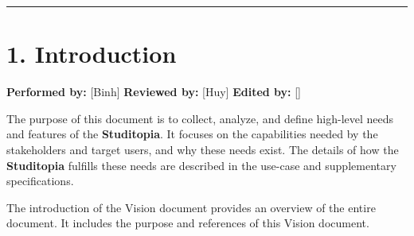 \documentclass[12pt]{article}
\begin{document}
\par\noindent\rule{\linewidth}{0.4pt}\par\medskip
\hypertarget{sec:1-introduction}{}
\section*{1. Introduction}
\par\medskip
\textbf{\textbf{Performed by:}} [Binh] \textbar{} \textbf{\textbf{Reviewed by:}} [Huy] \textbar{} \textbf{\textbf{Edited by:}} []
\par\medskip
The purpose of this document is to collect, analyze, and define high-level needs and features of the \textbf{Studitopia}. It focuses on the capabilities needed by the stakeholders and target users, and why these needs exist. The details of how the \textbf{Studitopia} fulfills these needs are described in the use-case and supplementary specifications.
\par\medskip
The introduction of the Vision document provides an overview of the entire document. It includes the purpose and references of this Vision document.
\par\medskip
\hypertarget{sec:11-references}{}
\end{document}
